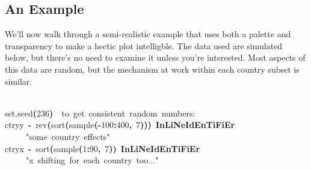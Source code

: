 \documentclass[a4paper]{article}
\newcommand{\hlnumber}[1]{\textcolor[rgb]{0.0823529411764706,0.0784313725490196,0.709803921568627}{#1}}%
\newcommand{\hlfunctioncall}[1]{\textcolor[rgb]{1,0,0}{#1}}%
\newcommand{\hlstring}[1]{\textcolor[rgb]{0.6,0.6,1}{#1}}%
\newcommand{\hlkeyword}[1]{\textcolor[rgb]{0,0,0}{\textbf{#1}}}%
\newcommand{\hlcomment}[1]{\textcolor[rgb]{0.8,0.8,0.8}{#1}}%
\newcommand{\hlassignement}[1]{\textcolor[rgb]{0.215686274509804,0.215686274509804,0.384313725490196}{\textbf{#1}}}%
\newcommand{\hlsymbol}[1]{\textcolor[rgb]{0,0,0}{#1}}%
\newcommand{\hlprompt}[1]{\textcolor[rgb]{0,0,0}{#1}}%
\newcommand{\hlstd}[1]{\textcolor[rgb]{0,0,0}{#1}}%
\newenvironment{Houtput}{\raggedright}{%
%
}
\begin{document}
\subsection{An Example}
We'll now walk through a semi-realistic example that uses both a palette and transparency to make a hectic plot intelligble. The data used are simulated below, but there's no need to examine it unless you're interested. Most aspects of this data are random, but the mechanism at work within each country subset is similar.

\begin{Houtput}
\hspace*{\fill}\\
\hlstd{}\ttfamily\noindent
\hlprompt{\usebox{\hlnormalsizeboxgreaterthan}{\ }}\hlfunctioncall{set.seed}\hlkeyword{(}\hlnumber{236}\hlkeyword{)}{\ }{\ }\hlcomment{\usebox{\hlnormalsizeboxhash}{\ }to{\ }get{\ }consistent{\ }random{\ }numbers:}\mbox{}
\normalfont
\hspace*{\fill}\\
\hlstd{}\ttfamily\noindent
\hlprompt{\usebox{\hlnormalsizeboxgreaterthan}{\ }}\hlsymbol{ctry\usebox{\hlnormalsizeboxunderscore}y}{\ }\hlassignement{\usebox{\hlnormalsizeboxlessthan}-}{\ }\hlfunctioncall{rev}\hlkeyword{(}\hlfunctioncall{sort}\hlkeyword{(}\hlfunctioncall{sample}\hlkeyword{(}\hlkeyword{-}\hlnumber{100}\hlkeyword{:}\hlnumber{400}\hlkeyword{,}{\ }\hlnumber{7}\hlkeyword{)}\hlkeyword{)}\hlkeyword{)}{\ }\hlkeyword{\usebox{\hlnormalsizeboxpercent}InLiNe\usebox{\hlnormalsizeboxunderscore}IdEnTiFiEr\usebox{\hlnormalsizeboxpercent}}\hspace*{\fill}\\
\hlstd{}\hlprompt{{\ }}{\ }{\ }{\ }{\ }\hlstring{"\usebox{\hlnormalsizeboxhash}{\ }some{\ }country{\ }effects"}\mbox{}
\normalfont
\hspace*{\fill}\\
\hlstd{}\ttfamily\noindent
\hlprompt{\usebox{\hlnormalsizeboxgreaterthan}{\ }}\hlsymbol{ctry\usebox{\hlnormalsizeboxunderscore}x}{\ }\hlassignement{\usebox{\hlnormalsizeboxlessthan}-}{\ }\hlfunctioncall{sort}\hlkeyword{(}\hlfunctioncall{sample}\hlkeyword{(}\hlnumber{1}\hlkeyword{:}\hlnumber{90}\hlkeyword{,}{\ }\hlnumber{7}\hlkeyword{)}\hlkeyword{)}{\ }\hlkeyword{\usebox{\hlnormalsizeboxpercent}InLiNe\usebox{\hlnormalsizeboxunderscore}IdEnTiFiEr\usebox{\hlnormalsizeboxpercent}}\hspace*{\fill}\\
\hlstd{}\hlprompt{{\ }}{\ }{\ }{\ }{\ }\hlstring{"\usebox{\hlnormalsizeboxhash}{\ }x{\ }shifting{\ }for{\ }each{\ }country{\ }too..."}\mbox{}

\end{Houtput}
\end{document}
